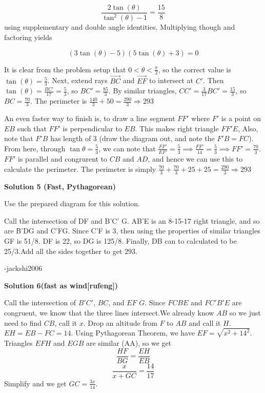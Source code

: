 \begin{enumerate}
 
 \[\frac{2\tan(\theta)}{\tan^2(\theta)-1}=\frac{15}{8}\] using supplementary and double angle identities. Multiplying though and factoring yields 

 
 \[(3\tan(\theta)-5)(5\tan(\theta)+3)=0\]

 It is clear from the problem setup that $0<\theta<\frac\pi2$, so the correct value is $\tan(\theta)=\frac53$. Next, extend rays $\overrightarrow{BC}$ and $\overrightarrow{EF}$ to intersect at $C'$. Then $\tan(\theta)=\frac{BC'}{17}=\frac53$, so $BC'=\frac{85}{3}$. By similar triangles, $CC'=\frac{3}{17}BC'=\frac{15}{3}$, so $BC=\frac{70}{3}$. The perimeter is $\frac{140}{3}+50=\frac{290}{3}\Longrightarrow \boxed{293}$

 An even faster way to finish is, to draw a line segment $FF'$ where $F'$ is a point on $EB$ such that $FF'$ is perpendicular to $EB$. This makes right triangle $FF'E$, Also, note that $F'B$ has length of $3$ (draw the diagram out, and note the $F'B =FC$). From here, through $\tan \theta = \frac{5}{3}$, we can note that $\frac{FF'}{EF'} = \frac{5}{3} \implies \frac{FF'}{14} = \frac{5}{3} \implies FF' = \frac{70}{3}$. $FF'$ is parallel and congrurent to $CB$ and $AD$, and hence we can use this to calculate the perimeter. The perimeter is simply $\frac{70}{3} + \frac{70}{3} + 25 + 25 = \frac{290}{3} \Longrightarrow \boxed{293}$




\textbf{Solution 5 (Fast, Pythagorean)}

Use the prepared diagram for this solution.

 Call the intersection of DF and B'C' G. AB'E is an 8-15-17 right triangle, and so are B'DG and C'FG. Since C'F is 3, then using the properties of similar triangles GF is 51/8. DF is 22, so DG is 125/8. Finally, DB can to calculated to be 25/3.Add all the sides together to get $\boxed{293}$.

 -jackshi2006

 



\textbf{Solution 6(fast as wind[rufeng])}

Call the intersection of $B'C'$, $BC$, and $EF$ $G$. Since $FCBE$ and $FC'B'E$ are congruent, we know that the three lines intersect.We already know $AB$ so we just need to find $CB$, call it $x$. Drop an altitude from $F$ to $AB$ and call it $H$. $EH=EB-FC=14$. Using Pythagorean Theorem, we have $EF=\sqrt{x^2+14^2}$. Triangles $EFH$ and $EGB$ are similar (AA), so we get
 \[\frac{HF}{BG}=\frac{EH}{EB}\]
 \[\frac{x}{x+GC}=\frac{14}{17}\]Simplify and we get $GC=\frac{3x}{14}$. 


\end{enumerate}
